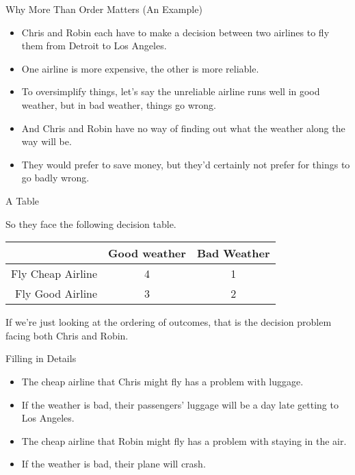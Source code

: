 \documentclass[
  ignorenonframetext,
]{beamer}
\providecommand{\tightlist}{%
  \setlength{\itemsep}{0pt}\setlength{\parskip}{0pt}}
\renewcommand{\,}{\text{, }}
\begin{document}
\begin{frame}{Why More Than Order Matters (An Example)}
\protect\hypertarget{why-more-than-order-matters-an-example}{}

\begin{itemize}
\tightlist
\item
  Chris and Robin each have to make a decision between two airlines to
  fly them from Detroit to Los Angeles.
\item
  One airline is more expensive, the other is more reliable.
\item
  To oversimplify things, let's say the unreliable airline runs well in
  good weather, but in bad weather, things go wrong.
\item
  And Chris and Robin have no way of finding out what the weather along
  the way will be.
\item
  They would prefer to save money, but they'd certainly not prefer for
  things to go badly wrong.
\end{itemize}

\end{frame}

\begin{frame}{A Table}
\protect\hypertarget{a-table}{}

So they face the following decision table.

\begin{longtable}[]{@{}rcc@{}}
\toprule
& Good weather & Bad Weather\tabularnewline
\midrule
\endhead
Fly Cheap Airline & 4 & 1\tabularnewline
Fly Good Airline & 3 & 2\tabularnewline
\bottomrule
\end{longtable}

If we're just looking at the ordering of outcomes, that is the decision
problem facing both Chris and Robin.

\end{frame}

\begin{frame}{Filling in Details}
\protect\hypertarget{filling-in-details}{}

\begin{itemize}
\tightlist
\item
  The cheap airline that Chris might fly has a problem with luggage.
\item
  If the weather is bad, their passengers' luggage will be a day late
  getting to Los Angeles. \pause 
\item
  The cheap airline that Robin might fly has a problem with staying in
  the air.
\item
  If the weather is bad, their plane will crash.
\end{itemize}

\end{frame}
\end{document}
